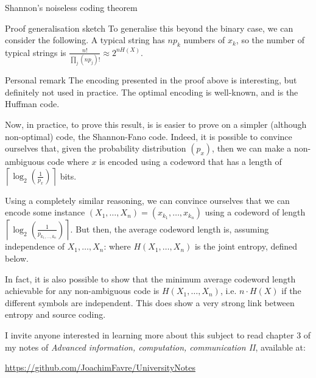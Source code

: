 \documentclass[a4paper]{article}
\begin{document}
\begin{parag}{Shannon's noiseless coding theorem}
    \begin{subparag}{Proof generalisation sketch}
        To generalise this beyond the binary case, we can consider the following. A typical string has $n p_k$ numbers of $x_k$, so the number of typical strings is $\frac{n!}{\prod_{j} \left(np_j\right)!} \approx 2^{n H\left(X\right)}$.
    \end{subparag}

    \begin{subparag}{Personal remark}
        The encoding presented in the proof above is interesting, but definitely not used in practice. The optimal encoding is well-known, and is the Huffman code.

        Now, in practice, to prove this result, is is easier to prove on a simpler (although non-optimal) code, the Shannon-Fano code. Indeed, it is possible to convince ourselves that, given the probability distribution $\left(p_x\right)$, then we can make a non-ambiguous code where $x$ is encoded using a codeword that has a length of $\left\lceil \log_2\left(\frac{1}{p_x}\right) \right\rceil $ bits. 

        Using a completely similar reasoning, we can convince ourselves that we can encode some instance $\left(X_1, \ldots, X_n\right) = \left(x_{k_1}, \ldots, x_{k_n}\right)$ using a codeword of length $\left\lceil \log_2\left(\frac{1}{p_{k_1, \ldots, k_n}}\right)  \right\rceil$. But then, the average codeword length is, assuming independence of $X_1, \ldots, X_n$: 
        where $H\left(X_1, \ldots, X_n\right)$ is the joint entropy, defined below.
        
        In fact, it is also possible to show that the minimum average codeword length achievable for any non-ambiguous code is $H\left(X_1, \ldots, X_n\right)$, i.e. $n\cdot H\left(X\right)$ if the different symbols are independent. This does show a very strong link between entropy and source coding.

        I invite anyone interested in learning more about this subject to read chapter 3 of my notes of \textit{Advanced information, computation, communication II}, available at:
        \begin{center}
            \url{https://github.com/JoachimFavre/UniversityNotes}
        \end{center}
    \end{subparag}
\end{parag}
\end{document}
